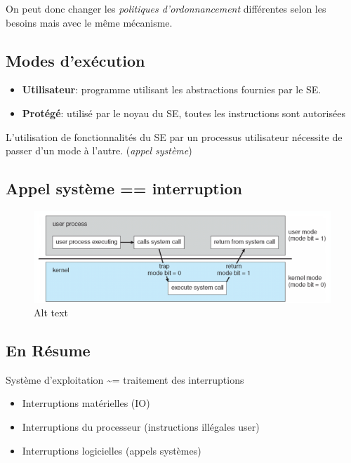 On peut donc changer les \emph{politiques d'ordonnancement} différentes
selon les besoins mais avec le même mécanisme.

\subsection{Modes d'exécution}\label{modes-dexuxe9cution}

\begin{itemize}
\tightlist
\item
  \textbf{Utilisateur}: programme utilisant les abstractions fournies
  par le SE.
\item
  \textbf{Protégé}: utilisé par le noyau du SE, toutes les instructions
  sont autorisées
\end{itemize}

L'utilisation de fonctionnalités du SE par un processus utilisateur
nécessite de passer d'un mode à l'autre. (\emph{appel système})

\subsection{Appel système ==
interruption}\label{appel-systuxe8me-interruption}

\begin{figure}
\centering
\includegraphics{image-2.png}
\caption{Alt text}
\end{figure}

\subsection{En Résume}\label{en-ruxe9sume}

Système d'exploitation \textasciitilde= traitement des interruptions

\begin{itemize}
\tightlist
\item
  Interruptions matérielles (IO)
\item
  Interruptions du processeur (instructions illégales user)
\item
  Interruptions logicielles (appels systèmes)
\end{itemize}

